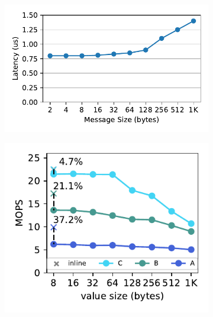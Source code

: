 

\begin{figure}[t]
    \centering
    \newcommand{\subfigwidth}{0.32\linewidth}
    \begin{subfigure}{\subfigwidth}
        \includegraphics[width=0.99\linewidth]{fig/rdma_latency.pdf}
    \end{subfigure}
    \begin{subfigure}{\subfigwidth}
      \includegraphics[width=0.99\linewidth]{fig/extent.pdf}

\end{subfigure}
\end{figure}
